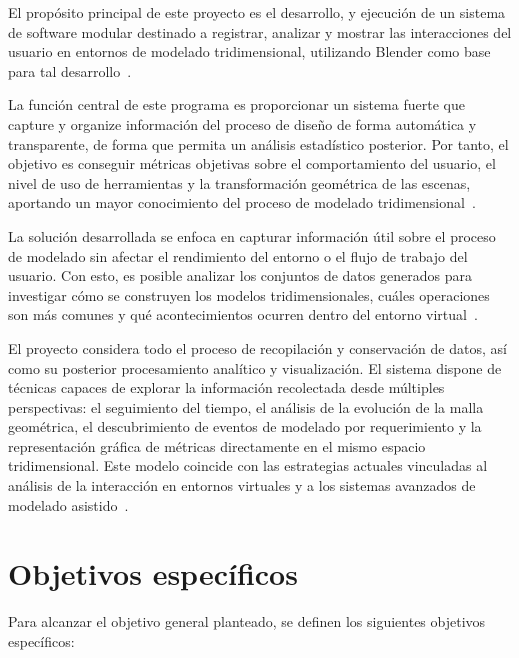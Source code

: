 
El propósito principal de este proyecto es el desarrollo, y ejecución de un sistema de software modular destinado a registrar, analizar y mostrar las interacciones del usuario en entornos de modelado tridimensional, utilizando Blender como base para tal desarrollo~\cite{pressman2005}.

La función central de este programa es proporcionar un sistema fuerte que capture y organize información del proceso de diseño de forma automática y transparente, de forma que permita un análisis estadístico posterior. Por tanto, el objetivo es conseguir métricas objetivas sobre el comportamiento del usuario, el nivel de uso de herramientas y la transformación geométrica de las escenas, aportando un mayor conocimiento del proceso de modelado tridimensional~\cite{jankowski2014,gao2021}.

La solución desarrollada se enfoca en capturar información útil sobre el proceso de modelado sin afectar el rendimiento del entorno o el flujo de trabajo del usuario. Con esto, es posible analizar los conjuntos de datos generados para investigar cómo se construyen los modelos tridimensionales, cuáles operaciones son más comunes y qué acontecimientos ocurren dentro del entorno virtual~\cite{xie2014,liu2022}.

El proyecto considera todo el proceso de recopilación y conservación de datos, así como su posterior procesamiento analítico y visualización. El sistema dispone de técnicas capaces de explorar la información recolectada desde múltiples perspectivas: el seguimiento del tiempo, el análisis de la evolución de la malla geométrica, el descubrimiento de eventos de modelado por requerimiento y la representación gráfica de métricas directamente en el mismo espacio tridimensional. Este modelo coincide con las estrategias actuales vinculadas al análisis de la interacción en entornos virtuales y a los sistemas avanzados de modelado asistido~\cite{malik2023}.

\section{Objetivos específicos}

Para alcanzar el objetivo general planteado, se definen los siguientes objetivos específicos:

